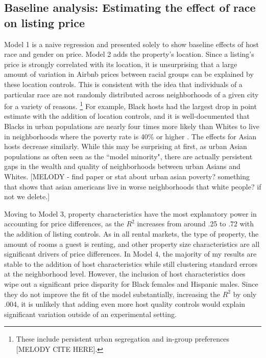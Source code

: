 \label{result1}
	
\subsection{Baseline analysis: Estimating the effect of race on listing price}

Model 1 is a naive regression and presented solely to show baseline effects of host race and gender on price. Model 2 adds the property's location. Since a listing's price is strongly correlated with its location, it is unsurprising that a large amount of variation in Airbnb prices between racial groups can be explained by these location controls. This is consistent with the idea that individuals of a particular race are not randomly distributed across neighborhoods of a given city for a variety of reasons.%
	\footnote{These include persistent urban segregation and in-group preferences [MELODY CITE HERE].}
For example, Black hosts had the largest drop in point estimate with the addition of location controls, and it is well-documented that Blacks in urban populations are nearly four times more likely than Whites to live in neighborhoods where the poverty rate is 40\% or higher \citep{firebaugh}. The effects for Asian hosts decrease similarly. While this may be surprising at first, as urban Asian populations as often seen as the ``model minority", there are actually persistent gaps in the wealth and quality of neighborhoods between urban Asians and Whites. [MELODY - find paper or stat about urban asian poverty? something that shows that asian americans live in worse neighborhoods that white people? if not we delete.]

Moving to Model 3, property characteristics have the most explanatory power in accounting for price differences, as the $R^2$ increases from around .25 to .72 with the addition of listing controls. As in all rental markets, the type of property, the amount of rooms a guest is renting, and other property size characteristics are all significant drivers of price differences. In Model 4, the majority of my results are stable to the addition of host characteristics while still clustering standard errors at the neighborhood level. However, the inclusion of host characteristics does wipe out a significant price disparity for Black females and Hispanic males. Since they do not improve the fit of the model substantially, increasing the $R^2$ by only .004, it is unlikely that adding even more host quality controls would explain significant variation outside of an experimental setting. 

